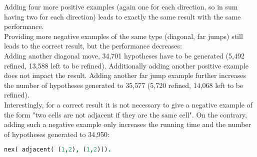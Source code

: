 Adding four more positive examples (again one for each direction, so in sum having two for each direction) leads to exactly the same result with the same performance.\\
Providing more negative examples of the same type (diagonal, far jumps) still leads to the correct result, but the performance decreases:\\
Adding another diagonal move, 34,701 hypotheses have to be generated (5,492 refined, 13,588 left to be refined). Additionally adding another positive example does not impact the result. 
Adding another far jump example further increases the number of hypotheses generated to 35,577 (5,720 refined, 14,068 left to be refined).\\
Interestingly, for a correct result it is not necessary to give a negative example of the form "two cells are not adjacent if they are the same cell". On the contrary, adding such a negative example only increases the running time and the number of hypotheses generated to 34,950:
\begin{lstlisting}[label={lst:adjacent_neg}, language=Prolog, caption=Negative example, belowcaptionskip=1cm]
nex( adjacent( (1,2), (1,2))).
\end{lstlisting}
